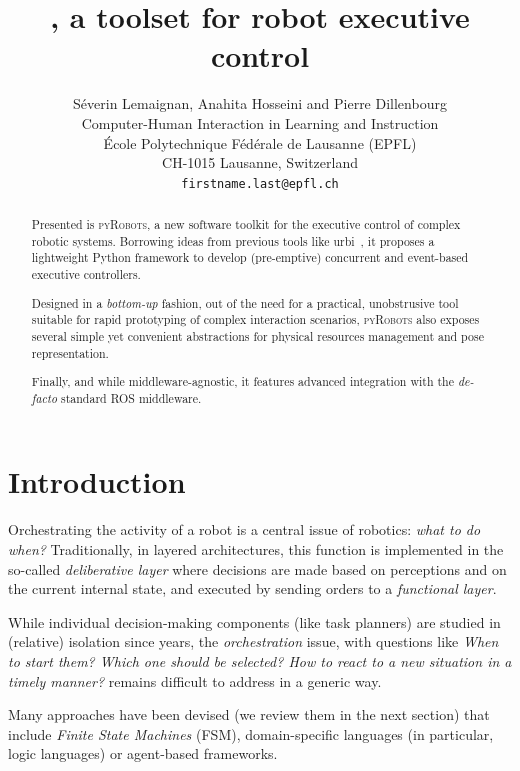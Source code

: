 \documentclass[a4paper, 10pt, conference]{ieeeconf}      %
\title{\LARGE \bf
    \pyRobots{}, a toolset for robot executive control
}
\author{Séverin Lemaignan, Anahita Hosseini and Pierre Dillenbourg\\
Computer-Human Interaction in Learning and Instruction \\
École Polytechnique Fédérale de Lausanne (EPFL) \\
CH-1015 Lausanne, Switzerland \\
{\tt\small firstname.last@epfl.ch}
}
\newcommand{\pyRobots}{\textsc{pyRobots}}
\begin{document}
\maketitle
\thispagestyle{empty}
\pagestyle{empty}


\begin{abstract}

Presented is \pyRobots{}, a new software toolkit for the executive control of
complex robotic systems. Borrowing ideas from previous tools like {\sc
urbi}~\cite{baillie2005urbi}, it proposes a lightweight Python framework to
develop (pre-emptive) concurrent and event-based executive controllers.

Designed in a \emph{bottom-up} fashion, out of the need for a practical,
unobstrusive tool suitable for rapid prototyping of complex interaction
scenarios, \pyRobots{} also exposes several simple yet convenient abstractions for
physical resources management and pose representation.

Finally, and while middleware-agnostic, it features advanced integration with
the \textit{de-facto} standard ROS middleware.

\end{abstract}


\section{Introduction}

Orchestrating the activity of a robot is a central issue of robotics: \emph{what
to do when?} Traditionally, in layered architectures, this function is
implemented in the so-called \emph{deliberative layer} where decisions are made
based on perceptions and on the current internal state, and executed by sending
orders to a \emph{functional layer}.

While individual decision-making components (like task planners) are studied in
(relative) isolation since years, the \emph{orchestration} issue, with questions
like \textit{When to start them? Which one should be selected? How to react to a
new situation in a timely manner?} remains difficult to address in a generic
way.

Many approaches have been devised (we review them in the next section) that
include \emph{Finite State Machines} (FSM), domain-specific languages (in
particular, logic languages) or agent-based frameworks.
\end{document}
